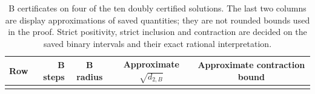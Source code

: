 \begin{longtable}{@{}rrccc@{}}
\toprule
Row & B steps & B radius & Approximate $\sqrt{d_{2,B}}$ & Approximate contraction bound\\
\midrule
\bottomrule
\caption{B certificates on four of the ten doubly certified solutions. The
last two columns are display approximations of saved quantities;
they are not rounded bounds used in the proof. Strict positivity,
strict inclusion and contraction are decided on the saved binary
intervals and their exact rational interpretation.}
\label{tab:second}
\end{longtable}
